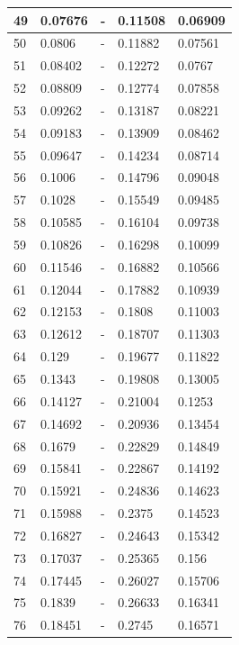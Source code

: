 \begin{table}[!ht]
\begin{tabular}{|l|l|l|l|l|}
        49 & 0.07676 & - & 0.11508 & 0.06909 \\ \hline
        50 & 0.0806 & - & 0.11882 & 0.07561 \\ \hline
        51 & 0.08402 & - & 0.12272 & 0.0767 \\ \hline
        52 & 0.08809 & - & 0.12774 & 0.07858 \\ \hline
        53 & 0.09262 & - & 0.13187 & 0.08221 \\ \hline
        54 & 0.09183 & - & 0.13909 & 0.08462 \\ \hline
        55 & 0.09647 & - & 0.14234 & 0.08714 \\ \hline
        56 & 0.1006 & - & 0.14796 & 0.09048 \\ \hline
        57 & 0.1028 & - & 0.15549 & 0.09485 \\ \hline
        58 & 0.10585 & - & 0.16104 & 0.09738 \\ \hline
        59 & 0.10826 & - & 0.16298 & 0.10099 \\ \hline
        60 & 0.11546 & - & 0.16882 & 0.10566 \\ \hline
        61 & 0.12044 & - & 0.17882 & 0.10939 \\ \hline
        62 & 0.12153 & - & 0.1808 & 0.11003 \\ \hline
        63 & 0.12612 & - & 0.18707 & 0.11303 \\ \hline
        64 & 0.129 & - & 0.19677 & 0.11822 \\ \hline
        65 & 0.1343 & - & 0.19808 & 0.13005 \\ \hline
        66 & 0.14127 & - & 0.21004 & 0.1253 \\ \hline
        67 & 0.14692 & - & 0.20936 & 0.13454 \\ \hline
        68 & 0.1679 & - & 0.22829 & 0.14849 \\ \hline
        69 & 0.15841 & - & 0.22867 & 0.14192 \\ \hline
        70 & 0.15921 & - & 0.24836 & 0.14623 \\ \hline
        71 & 0.15988 & - & 0.2375 & 0.14523 \\ \hline
        72 & 0.16827 & - & 0.24643 & 0.15342 \\ \hline
        73 & 0.17037 & - & 0.25365 & 0.156 \\ \hline
        74 & 0.17445 & - & 0.26027 & 0.15706 \\ \hline
        75 & 0.1839 & - & 0.26633 & 0.16341 \\ \hline
        76 & 0.18451 & - & 0.2745 & 0.16571 \\ \hline

\end{tabular}
\end{table}
